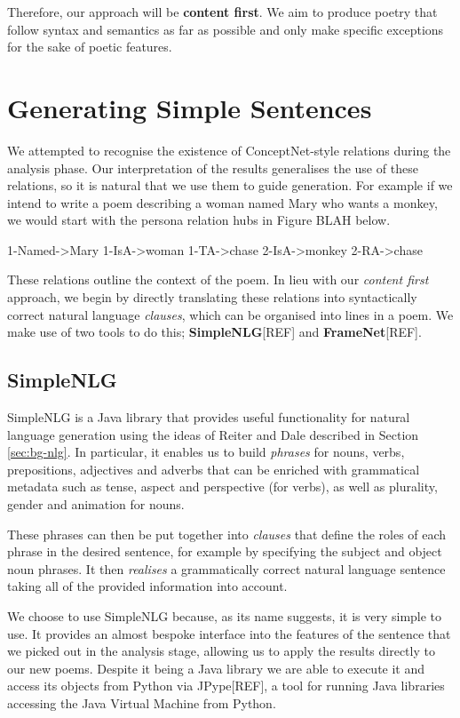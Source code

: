 Therefore, our approach will be \textbf{content first}. We aim to produce poetry that follow syntax and semantics as far as possible and only make specific exceptions for the sake of poetic features.


\section{Generating Simple Sentences}
We attempted to recognise the existence of ConceptNet-style relations during the analysis phase. Our interpretation of the results generalises the use of these relations, so it is natural that we use them to guide generation. For example if we intend to write a poem describing a woman named Mary who wants a monkey, we would start with the persona relation hubs in Figure BLAH below.

1-Named->Mary
1-IsA->woman
1-TA->chase
2-IsA->monkey
2-RA->chase

These relations outline the context of the poem. In lieu with our \textit{content first} approach, we begin by directly translating these relations into syntactically correct natural language \textit{clauses}, which can be organised into lines in a poem. We make use of two tools to do this; \textbf{SimpleNLG}[REF] and \textbf{FrameNet}[REF].

\subsection{SimpleNLG}
SimpleNLG is a Java library that provides useful functionality for natural language generation using the ideas of Reiter and Dale described in Section \ref{sec:bg-nlg}. In particular, it enables us to build \textit{phrases} for nouns, verbs, prepositions, adjectives and adverbs that can be enriched with grammatical metadata such as tense, aspect and perspective (for verbs), as well as plurality, gender and animation for nouns.

These phrases can then be put together into \textit{clauses} that define the roles of each phrase in the desired sentence, for example by specifying the subject and object noun phrases. It then \textit{realises} a grammatically correct natural language sentence taking all of the provided information into account.

We choose to use SimpleNLG because, as its name suggests, it is very simple to use. It provides an almost bespoke interface into the features of the sentence that we picked out in the analysis stage, allowing us to apply the results directly to our new poems. Despite it being a Java library we are able to execute it and access its objects from Python via JPype[REF], a tool for running Java libraries accessing the Java Virtual Machine from Python.

